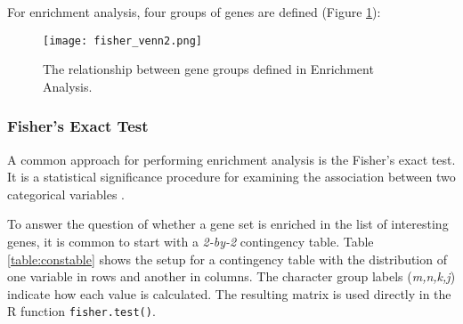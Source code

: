         For enrichment analysis, four groups of genes are defined (Figure \ref{fig:fishervenn}):
        
        
                \begin{figure}[!h]
                \centering
               \texttt{[image: fisher\_venn2.png]}
                \caption{The relationship between gene groups defined in Enrichment Analysis.}
                \label{fig:fishervenn}
                \end{figure}
                
        \subsubsection{Fisher's Exact Test}
        
        A common approach for performing enrichment analysis is the Fisher’s exact test. It is a statistical significance procedure for examining the association between two categorical variables \cite{Fishersexacttest}. 
        
        To answer the question of whether a gene set is enriched in the list of interesting genes, it is common to start with a \textit{2-by-2} contingency table. Table \ref{table:constable} shows the setup for a contingency table with the distribution of one variable in rows and another in columns. The character group labels (\textit{m,n,k,j}) indicate how each value is calculated. The resulting matrix is used directly in the R function \texttt{fisher.test()}. 
        
